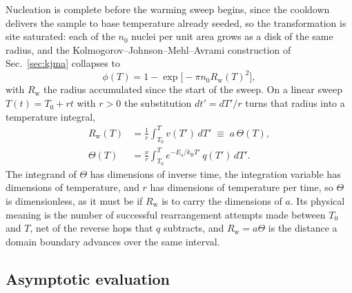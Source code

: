 \documentclass[reprint,twocolumn,prb,amsmath,amssymb,superscriptaddress,floatfix]{revtex4-2}
\newcommand{\kB}{k_{\mathrm{B}}}
\newcommand{\Ea}{E_{\mathrm{a}}}
\begin{document}
Nucleation is complete before the warming sweep begins, since the cooldown delivers the sample
to base temperature already seeded, so the transformation is site saturated: each of the $n_{0}$
nuclei per unit area grows as a disk of the same radius, and the
Kolmogorov--Johnson--Mehl--Avrami construction of Sec.~\ref{sec:kjma} collapses to
\begin{equation}
  \phi(T) = 1-\exp\bigl[-\pi n_{0}R_{\mathrm{w}}(T)^{2}\bigr],
  \label{eq:sm-formal}
\end{equation}
with $R_{\mathrm{w}}$ the radius accumulated since the start of the sweep. On a linear sweep
$T(t)=T_{0}+rt$ with $r>0$ the substitution $dt'=dT'/r$ turns that radius into a temperature
integral,
\begin{equation}
\begin{aligned}
  R_{\mathrm{w}}(T) &= \frac{1}{r}\int_{T_{0}}^{T}v(T')\,dT' \;\equiv\; a\,\Theta(T),\\[2pt]
  \Theta(T) &= \frac{\nu}{r}\int_{T_{0}}^{T}e^{-\Ea/\kB T'}\,q(T')\,dT'.
\end{aligned}
  \label{eq:sm-theta-def}
\end{equation}
The integrand of $\Theta$ has dimensions of inverse time, the integration variable has
dimensions of temperature, and $r$ has dimensions of temperature per time, so $\Theta$ is
dimensionless, as it must be if $R_{\mathrm{w}}$ is to carry the dimensions of $a$. Its
physical meaning is the number of successful rearrangement attempts made between $T_{0}$ and
$T$, net of the reverse hops that $q$ subtracts, and $R_{\mathrm{w}}=a\Theta$ is the distance a
domain boundary advances over the same interval.

\subsection{Asymptotic evaluation}
\end{document}
